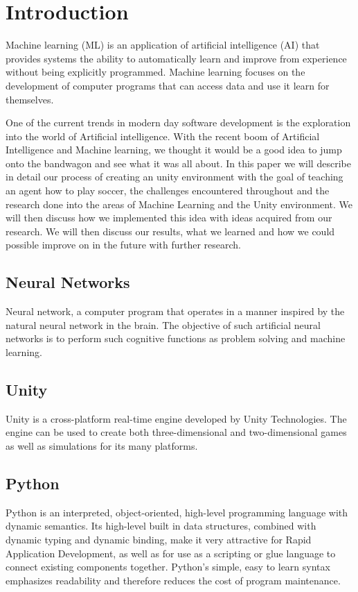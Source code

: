 
\chapter{Introduction}
Machine learning (ML) is an application of artificial intelligence (AI) that provides systems the ability to automatically learn and improve from experience without being explicitly programmed. Machine learning focuses on the development of computer programs that can access data and use it learn for themselves.

One of the current trends in modern day software development is the exploration into the world of Artificial intelligence.
With the recent boom of Artificial Intelligence and Machine learning, we thought it would be a good idea to jump onto the bandwagon and see what it was all about.
In this paper we will describe in detail our process of creating an unity environment with the goal of teaching an agent how to play soccer, the challenges encountered throughout and the research done into the areas of Machine Learning and the Unity environment.  We will then discuss how we implemented this idea with ideas acquired from our research. We will then discuss our results, what we learned and how we could possible improve on in the future with further research.

\section{Neural Networks}
Neural network, a computer program that operates in a manner inspired by the natural neural network in the brain. The objective of such artificial neural networks is to perform such cognitive functions as problem solving and machine learning.
\section{Unity}
Unity is a cross-platform real-time engine developed by Unity Technologies. The engine can be used to create both three-dimensional and two-dimensional games as well as simulations for its many platforms.
\section{Python}
Python is an interpreted, object-oriented, high-level programming language with dynamic semantics. Its high-level built in data structures, combined with dynamic typing and dynamic binding, make it very attractive for Rapid Application Development, as well as for use as a scripting or glue language to connect existing components together. Python's simple, easy to learn syntax emphasizes readability and therefore reduces the cost of program maintenance. 



